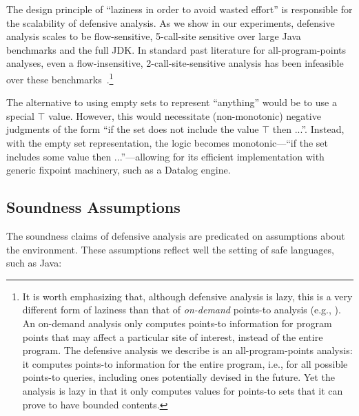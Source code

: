 The design principle of ``laziness in order to avoid wasted effort'' is responsible for the scalability of defensive analysis. As we show in our experiments, defensive analysis scales to be flow-sensitive, 5-call-site sensitive over large Java benchmarks and the full JDK. In standard past literature for all-program-points analyses, even a flow-insensitive, 2-call-site-sensitive analysis has been
infeasible over these benchmarks~\cite{pldi:2014:Smaragdakis}.\footnote{It is worth emphasizing that, although defensive analysis is lazy, this is a very different form of laziness than that of \emph{on-demand} points-to analysis (e.g., \cite{ecoop:2016:Spath,popl:1997:Biswas}). An on-demand analysis only computes points-to information for program points that may affect a particular site of interest, instead of the entire program. The defensive analysis we describe is an all-program-points analysis: it computes points-to information for the entire program, i.e., for all possible points-to queries, including ones potentially devised in the future. Yet the analysis is lazy in that it only computes values for points-to sets that it can prove to have bounded contents.}

The alternative to using empty sets to represent ``anything'' would be to use a special $\top$ value. However, this would necessitate (non-monotonic) negative judgments of the form ``if the set does not include the value $\top$ then ...''. Instead, with the empty set representation, the logic becomes monotonic---``if the set includes some value then ...''---allowing for its efficient implementation with generic fixpoint machinery, such as a Datalog engine.


\subsection{Soundness Assumptions}
\label{sec:sound:assumptions}

The soundness claims of defensive analysis are predicated on assumptions about the environment. These assumptions reflect well the setting of safe languages, such as Java:

